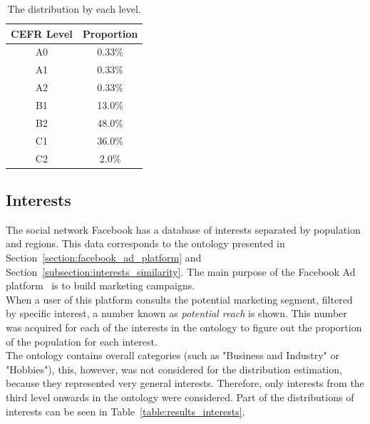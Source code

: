 \begin{table}[H]
    \centering
    \begin{tabular}{cc}
    \hline
    CEFR Level & Proportion \\
    \hline
    A0         & 0.33\%     \\
    A1         & 0.33\%     \\
    A2         & 0.33\%     \\
    B1         & 13.0\%     \\
    B2         & 48.0\%     \\
    C1         & 36.0\%     \\
    C2         & 2.0\%      \\
    \hline
    \end{tabular}
    \caption{The distribution by each level.}
    \label{table:results_levels}
\end{table}

\subsection{Interests} 

The social network Facebook has a database of interests separated by population and regions. This data corresponds to the ontology presented in Section~\ref{section:facebook_ad_platform} and Section~\ref{subsection:interests_similarity}. The main purpose of the Facebook Ad platform~\cite{facebook_business} is to build marketing campaigns.\\

When a user of this platform consults the potential marketing segment, filtered by specific interest, a number known as \textit{potential reach} is shown. This number was acquired for each of the interests in the ontology to figure out the proportion of the population for each interest.\\

The ontology contains overall categories (such as "Business and Industry" or "Hobbies"), this, however, was not considered for the distribution estimation, because they represented very general interests. Therefore, only interests from the third level onwards in the ontology were considered. Part of the distributions of interests can be seen in Table~\ref{table:results_interests}. \\

